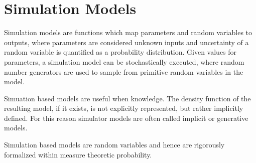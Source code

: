 
\section{Simulation Models}\label{simmodels}

Simulation models are functions which map parameters and random variables to outputs, where parameters are considered unknown inputs and uncertainty of a random variable is quantified as a probability distribution.
Given values for parameters, a simulation model can be stochastically executed, where random number generators are used to sample from primitive random variables in the model.

Simuation based models are useful when knowledge.
The density function of the resulting model, if it exists, is not explicitly represented, but rather implicitly defined.
For this reason simulator models are often called implicit or generative models.

Simulation based models are random variables and hence are rigorously formalized within measure theoretic probability.




